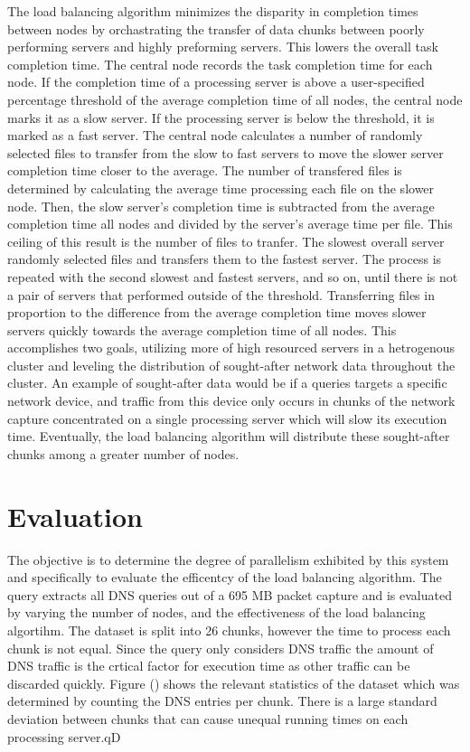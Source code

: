 \documentclass{article}
\begin{document}
\begin{multicols}{2}
The load balancing algorithm minimizes the disparity in completion times between nodes by orchastrating the transfer of data chunks between poorly performing servers and highly preforming servers. This lowers the overall task completion time.  The central node records the task completion time for each node.  If the completion time of a processing server is above a user-specified percentage threshold of the average completion time of all nodes, the central node marks it as a slow server. If the processing server is below the threshold, it is marked as a fast server.  The central node calculates a number of randomly selected files to transfer from the slow to fast servers to move the slower server completion time closer to the average. The number of transfered files is determined by calculating the average time processing each file on the slower node.  Then, the slow server's completion time is subtracted from the average completion time all nodes and divided by the server's average time per file. This ceiling of this result is the number of files to tranfer. The slowest overall server randomly selected files and transfers them to the fastest server.  The process is repeated with the second slowest and fastest servers, and so on, until there is not a pair of servers that performed outside of the threshold.  Transferring files in proportion to the difference from the average completion time moves slower servers quickly towards the average completion time of all nodes.  This accomplishes two goals, utilizing more of high resourced servers in a hetrogenous cluster and leveling the distribution of sought-after network data throughout the cluster.  An example of sought-after data would be if a queries targets a specific network device, and traffic from this device only occurs in chunks of the network capture concentrated on a single processing server which will slow its execution time.  Eventually, the load balancing algorithm will distribute these sought-after chunks among a greater number of nodes. 

\section*{Evaluation} 


The objective is to determine the degree of parallelism exhibited by this system and specifically to evaluate the efficentcy of the load balancing algorithm. The query extracts all DNS queries out of a 695 MB packet capture and is evaluated by varying the number of nodes, and the effectiveness of the load balancing algortihm.  The dataset is split into 26 chunks, however the time to process each chunk is not equal.  Since the query only considers DNS traffic the amount of DNS traffic is the crtical factor for execution time as other traffic can be discarded quickly.  Figure () shows the relevant statistics of the dataset which was determined by counting the DNS entries per chunk.  There is a large standard deviation between chunks that can cause unequal running times on each processing server.qD



\end{multicols}
\end{document}
